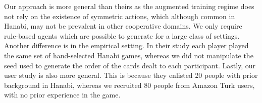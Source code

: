 \documentclass[letterpaper]{article} %
\begin{document}
Our approach is more general than theirs as the  augmented training regime
does not rely on the existence of symmetric actions, which although common in Hanabi, may not be prevalent in other cooperative domains. We only require rule-based agents which are  possible to generate for a large class of settings. Another difference is in the empirical setting.
In their study each player played the same set of hand-selected Hanabi games, whereas     we did not manipulate the seed used to generate the order of the cards dealt to each participant.
Lastly, our user study is also more general. This is because they enlisted 20 people with prior background in Hanabi, whereas we recruited 80 people from Amazon Turk users, with no prior experience in the game. %


\end{document}
